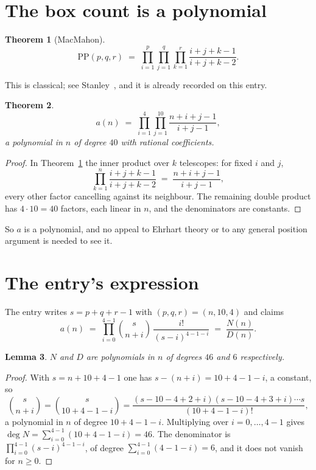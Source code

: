 \documentclass[11pt,a4paper]{article}
\theoremstyle{plain}
\newtheorem{theorem}{Theorem}
\newtheorem{lemma}[theorem]{Lemma}
\theoremstyle{definition}
\begin{document}
\section{The box count is a polynomial}

\begin{theorem}[MacMahon]\label{thm:mm}
\[
\mathrm{PP}(p,q,r)\;=\;\prod_{i=1}^{p}\prod_{j=1}^{q}\prod_{k=1}^{r}
\frac{i+j+k-1}{i+j+k-2} .
\]
\end{theorem}

This is classical; see Stanley~\cite{stanley}, and it is already recorded on this entry.

\begin{theorem}\label{thm:poly}
\[
a(n)\;=\;\prod_{i=1}^{4}\prod_{j=1}^{10}\frac{n+i+j-1}{i+j-1},
\]
a polynomial in $n$ of degree $40$ with rational coefficients.
\end{theorem}

\begin{proof}
In Theorem~\ref{thm:mm} the inner product over $k$ telescopes: for fixed $i$ and $j$,
\[
\prod_{k=1}^{n}\frac{i+j+k-1}{i+j+k-2}\;=\;\frac{n+i+j-1}{i+j-1} ,
\]
every other factor cancelling against its neighbour. The remaining double product has
$4\cdot10=40$ factors, each linear in $n$, and the denominators are constants.
\end{proof}

So $a$ is a polynomial, and no appeal to Ehrhart theory or to any general position argument is
needed to see it.

\section{The entry's expression}

The entry writes $s=p+q+r-1$ with $(p,q,r)=(n,10,4)$ and claims
\[
a(n)\;=\;\prod_{i=0}^{4-1}\binom{s}{n+i}\,\frac{i!}{(s-i)^{4-1-i}}\;=\;
\frac{N(n)}{D(n)} .
\]

\begin{lemma}\label{lem:deg}
$N$ and $D$ are polynomials in $n$ of degrees $46$ and $6$ respectively.
\end{lemma}

\begin{proof}
With $s=n+10+4-1$ one has $s-(n+i)=10+4-1-i$, a constant, so
\[
\binom{s}{n+i}=\binom{s}{10+4-1-i}
=\frac{(s-10-4+2+i)(s-10-4+3+i)\cdots s}{(10+4-1-i)!},
\]
a polynomial in $n$ of degree $10+4-1-i$. Multiplying over $i=0,\dots,4-1$ gives
$\deg N=\sum_{i=0}^{4-1}(10+4-1-i)=46$. The denominator is
$\prod_{i=0}^{4-1}(s-i)^{4-1-i}$, of degree
$\sum_{i=0}^{4-1}(4-1-i)=6$, and it does not vanish for $n\ge0$.
\end{proof}
\end{document}
